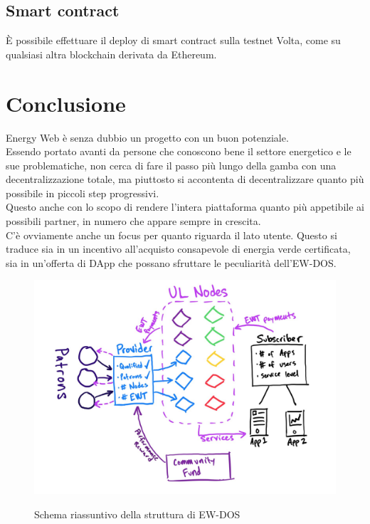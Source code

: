 \documentclass[12pt, letterpaper, twoside]{article}
\begin{document}
\subsection{Smart contract}
È possibile effettuare il deploy di smart contract sulla testnet Volta, come su qualsiasi altra blockchain derivata da Ethereum.

\newpage

\section{Conclusione}
Energy Web è senza dubbio un progetto con un buon potenziale. \\
Essendo portato avanti da persone che conoscono bene il settore energetico e le sue problematiche, non cerca di fare il passo più lungo della gamba con una decentralizzazione totale, ma piuttosto si accontenta di decentralizzare quanto più possibile in piccoli step progressivi. \\
Questo anche con lo scopo di rendere l'intera piattaforma quanto più appetibile ai possibili partner, in numero che appare sempre in crescita. \\
C'è ovviamente anche un focus per quanto riguarda il lato utente.
Questo si traduce sia in un incentivo all'acquisto consapevole di energia verde certificata, sia in un'offerta di DApp che possano sfruttare le peculiarità dell'EW-DOS.

\begin{figure}[h]
    \includegraphics[width=13cm]{ew-schema}
    \centering
    \label{ew-schema}
    \caption{Schema riassuntivo della struttura di EW-DOS \cite{tweet:ew-schema}}
\end{figure}

\newpage

\printbibliography
\end{document}
